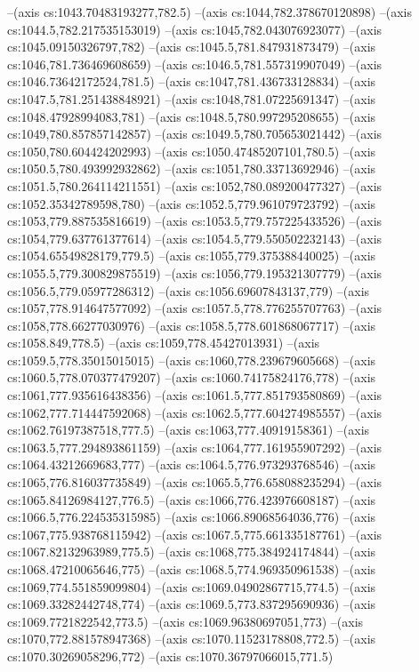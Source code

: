 --(axis cs:1043.70483193277,782.5)
--(axis cs:1044,782.378670120898)
--(axis cs:1044.5,782.217535153019)
--(axis cs:1045,782.043076923077)
--(axis cs:1045.09150326797,782)
--(axis cs:1045.5,781.847931873479)
--(axis cs:1046,781.736469608659)
--(axis cs:1046.5,781.557319907049)
--(axis cs:1046.73642172524,781.5)
--(axis cs:1047,781.436733128834)
--(axis cs:1047.5,781.251438848921)
--(axis cs:1048,781.07225691347)
--(axis cs:1048.47928994083,781)
--(axis cs:1048.5,780.997295208655)
--(axis cs:1049,780.857857142857)
--(axis cs:1049.5,780.705653021442)
--(axis cs:1050,780.604424202993)
--(axis cs:1050.47485207101,780.5)
--(axis cs:1050.5,780.493992932862)
--(axis cs:1051,780.33713692946)
--(axis cs:1051.5,780.264114211551)
--(axis cs:1052,780.089200477327)
--(axis cs:1052.35342789598,780)
--(axis cs:1052.5,779.961079723792)
--(axis cs:1053,779.887535816619)
--(axis cs:1053.5,779.757225433526)
--(axis cs:1054,779.637761377614)
--(axis cs:1054.5,779.550502232143)
--(axis cs:1054.65549828179,779.5)
--(axis cs:1055,779.375388440025)
--(axis cs:1055.5,779.300829875519)
--(axis cs:1056,779.195321307779)
--(axis cs:1056.5,779.05977286312)
--(axis cs:1056.69607843137,779)
--(axis cs:1057,778.914647577092)
--(axis cs:1057.5,778.776255707763)
--(axis cs:1058,778.66277030976)
--(axis cs:1058.5,778.601868067717)
--(axis cs:1058.849,778.5)
--(axis cs:1059,778.45427013931)
--(axis cs:1059.5,778.35015015015)
--(axis cs:1060,778.239679605668)
--(axis cs:1060.5,778.070377479207)
--(axis cs:1060.74175824176,778)
--(axis cs:1061,777.935616438356)
--(axis cs:1061.5,777.851793580869)
--(axis cs:1062,777.714447592068)
--(axis cs:1062.5,777.604274985557)
--(axis cs:1062.76197387518,777.5)
--(axis cs:1063,777.40919158361)
--(axis cs:1063.5,777.294893861159)
--(axis cs:1064,777.161955907292)
--(axis cs:1064.43212669683,777)
--(axis cs:1064.5,776.973293768546)
--(axis cs:1065,776.816037735849)
--(axis cs:1065.5,776.658088235294)
--(axis cs:1065.84126984127,776.5)
--(axis cs:1066,776.423976608187)
--(axis cs:1066.5,776.224535315985)
--(axis cs:1066.89068564036,776)
--(axis cs:1067,775.938768115942)
--(axis cs:1067.5,775.661335187761)
--(axis cs:1067.82132963989,775.5)
--(axis cs:1068,775.384924174844)
--(axis cs:1068.47210065646,775)
--(axis cs:1068.5,774.969350961538)
--(axis cs:1069,774.551859099804)
--(axis cs:1069.04902867715,774.5)
--(axis cs:1069.33282442748,774)
--(axis cs:1069.5,773.837295690936)
--(axis cs:1069.7721822542,773.5)
--(axis cs:1069.96380697051,773)
--(axis cs:1070,772.881578947368)
--(axis cs:1070.11523178808,772.5)
--(axis cs:1070.30269058296,772)
--(axis cs:1070.36797066015,771.5)
